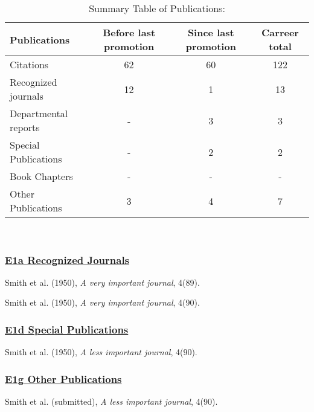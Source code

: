 \documentclass[11pt,letterpaper,roman]{article}
\newcounter{qcounter}
\begin{document}
\begin{table}[h]
\caption*{Summary Table of Publications:}
\label{tab:pubs}
\begin{center}
  \begin{tabular}{| l || c | c | c | }
    \hline
    Publications & Before last promotion & Since last promotion &  Carreer total \\ \hline
    Citations & 62 & 60 & 122 \\ \hline
    Recognized journals & 12 & 1 & 13\\ \hline
    Departmental reports & - & 3 & 3\\ \hline
    Special Publications & - & 2 & 2\\ \hline
    Book Chapters & - & - & -\\ \hline
    Other Publications & 3 & 4 & 7\\ \hline
  \end{tabular}\\
\end{center}
\end{table}


\subsubsection*{\underline{E1a Recognized Journals}}
\begin{list}{E1a-:~}{}
\item \label{pub1} Smith et al. (1950), \textit{A very important journal}, 4(89).
\item \label{pub2} Smith et al. (1950), \textit{A very important journal}, 4(90).
\end{list}


\subsubsection*{\underline{E1d Special Publications}}
\begin{list}{E1d-:~}{}
\item \label{pub3} Smith et al. (1950), \textit{A less important journal}, 4(90).
\end{list}


\subsubsection*{\underline{E1g Other Publications}}

\begin{list}{E1g-:~}{}
\item \label{pub4} Smith et al. (submitted), \textit{A less important journal}, 4(90).
\end{list}
\end{document}
